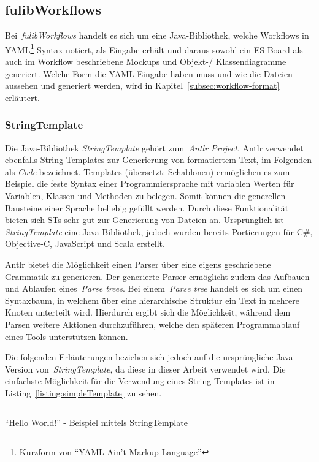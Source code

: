\subsection{fulibWorkflows}\label{subsec:fulibworkflows}
Bei~\textit{fulibWorkflows} handelt es sich um eine Java-Bibliothek, welche Workflows in YAML\footnote{Kurzform von ``YAML Ain't Markup Language''}-Syntax notiert,
als Eingabe erhält und daraus
sowohl ein \ac{ES}-Board als auch im Workflow beschriebene Mockups und Objekt-/ Klassendiagramme generiert.
Welche Form die YAML-Eingabe haben muss und wie die Dateien aussehen und generiert werden, wird in Kapitel~\ref{subsec:workflow-format} erläutert.

\subsubsection{StringTemplate}
Die Java-Bibliothek \textit{StringTemplate} gehört zum~\textit{Antlr Project}.
\ac{Antlr} verwendet ebenfalls String-Templates zur Generierung von formatiertem Text, im Folgenden als \textit{Code} bezeichnet.
Templates (übersetzt: Schablonen) ermöglichen es zum Beispiel die feste Syntax einer Programmiersprache mit variablen Werten für
Variablen, Klassen und Methoden zu belegen.
Somit können die generellen Bausteine einer Sprache beliebig gefüllt werden.
Durch diese Funktionalität bieten sich \acp{ST} sehr gut zur Generierung von Dateien an.
Ursprünglich ist \textit{StringTemplate} eine Java-Bibliothek, jedoch wurden bereits Portierungen für C\#, Objective-C, JavaScript und Scala erstellt.

\ac{Antlr} bietet die Möglichkeit einen Parser über eine eigens geschriebene Grammatik zu generieren.
Der generierte Parser ermöglicht zudem das Aufbauen und Ablaufen eines~\textit{Parse trees}.
Bei einem~\textit{Parse tree} handelt es sich um einen Syntaxbaum, in welchem über eine hierarchische Struktur ein Text in mehrere Knoten unterteilt wird.
Hierdurch ergibt sich die Möglichkeit, während dem Parsen weitere Aktionen durchzuführen, welche den späteren Programmablauf eines Tools unterstützen können.

Die folgenden Erläuterungen beziehen sich jedoch auf die ursprüngliche Java-Version von~\textit{StringTemplate}, da diese in dieser Arbeit verwendet wird.
Die einfachste Möglichkeit für die Verwendung eines String Templates ist in Listing~\ref{listing:simpleTemplate} zu sehen.

\begin{listing}[!ht]
    \inputminted{java}{listings/2.2.1/JavaStringTemplateExample.java}
    \caption{``Hello World!'' - Beispiel mittels StringTemplate}
    \label{listing:simpleTemplate}
\end{listing}


